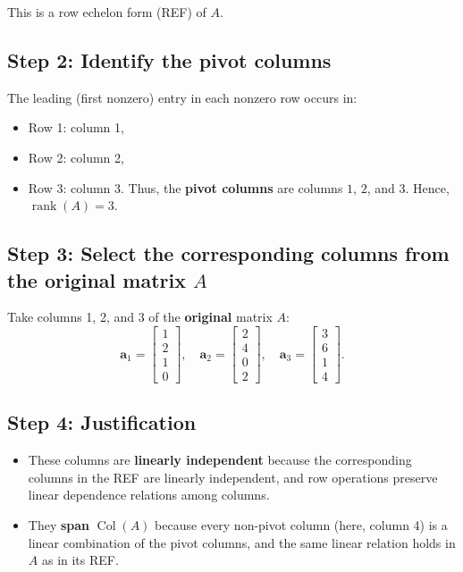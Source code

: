 \documentclass{article}
\begin{document}
This is a row echelon form (REF) of $A$.

\subsection*{Step 2: Identify the pivot columns}

The leading (first nonzero) entry in each nonzero row occurs in:
\begin{itemize}
\item Row 1: column 1,
    \item Row 2: column 2,
    \item Row 3: column 3.
Thus, the \textbf{pivot columns} are columns $1$, $2$, and $3$. Hence, $\operatorname{rank}(A) = 3$.
\end{itemize}
\subsection*{Step 3: Select the corresponding columns from the original matrix $A$}

Take columns 1, 2, and 3 of the \textbf{original} matrix $A$:
\[
\mathbf{a}_1 = \begin{bmatrix} 1 \\ 2 \\ 1 \\ 0 \end{bmatrix}, \quad
\mathbf{a}_2 = \begin{bmatrix} 2 \\ 4 \\ 0 \\ 2 \end{bmatrix}, \quad
\mathbf{a}_3 = \begin{bmatrix} 3 \\ 6 \\ 1 \\ 4 \end{bmatrix}.
\]

\subsection*{Step 4: Justification}
\begin{itemize}
\item These columns are \textbf{linearly independent} because the corresponding columns in the REF are linearly independent, and row operations preserve linear dependence relations among columns.
    \item They \textbf{span} $\operatorname{Col}(A)$ because every non-pivot column (here, column 4) is a linear combination of the pivot columns, and the same linear relation holds in $A$ as in its REF.
\end{itemize}
\end{document}
